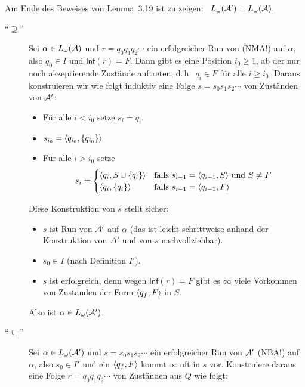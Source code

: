\documentclass[fontsize=11pt, twoside=false, numbers=autoenddot]{scrbook}
\begin{document}
Am Ende des Beweises von Lemma~3.19 ist zu zeigen:~ $L_\omega(\mathcal{A}') = L_\omega(\mathcal{A})$.
%
\begin{description}
  \item[{\boldmath"`$\supseteq$"'}]
    Sei $\alpha \in L_\omega(\mathcal{A})$ und $r = q_0q_1q_2\cdots$ ein
    erfolgreicher Run von \Amc (NMA!) auf $\alpha$, also $q_0 \in I$
    und $\textsf{Inf}(r) = F$.
    Dann gibt es eine Position $i_0 \geq 1$, ab der nur noch
    akzeptierende Zustände auftreten, d.\,h.\ $q_i \in F$ für alle $i \geq i_0$.
    Daraus konstruieren wir wie folgt induktiv eine Folge $s=s_0s_1s_2\cdots$ von Zuständen
    von $\mathcal{A}'$:
    \begin{itemize}
      \item
        Für alle $i < i_0$ setze $s_i = q_i$.
      \item
        $s_{i_0} = \langle q_{i_0},\{q_{i_0}\}\rangle$
      \item
        Für alle $i > i_0$ setze
        \[
          s_i = \begin{cases}
                  \langle q_i,S \cup \{q_i\}\rangle & \text{falls~} s_{i-1} = \langle q_{i-1},S\rangle \text{~und~} S \neq F \\
                  \langle q_i, \{q_i\}\rangle & \text{falls~} s_{i-1} = \langle q_{i-1},F\rangle 
                \end{cases}
        \]
    \end{itemize}
    Diese Konstruktion von $s$ stellt sicher:
    \begin{itemize}
      \item 
        $s$ ist Run von $\mathcal{A}'$ auf $\alpha$ (das ist leicht schrittweise anhand der Konstruktion von $\Delta'$
        und von $s$ nachvollziehbar).
      \item 
        $s_0 \in I$ (nach Definition $I'$).
      \item 
        $s$ ist erfolgreich, denn wegen $\textsf{Inf}(r) = F$
        gibt es $\infty$ viele Vorkommen von Zuständen der Form $\langle q_f,F\rangle$ in $S$.
    \end{itemize}
    Also ist $\alpha \in L_\omega(\mathcal{A}')$.
  \item[{\boldmath"`$\subseteq$"'}]
    Sei $\alpha \in L_\omega(\mathcal{A}')$ und $s = s_0s_1s_2\cdots$ ein
    erfolgreicher Run von $\mathcal{A}'$ (NBA!) auf $\alpha$, also $s_0 \in I'$
    und ein $\langle q_f,F\rangle$ kommt $\infty$ oft in $s$ vor.
    Konstruiere daraus eine Folge $r = q_0q_1q_2\cdots$ von Zuständen aus $Q$ wie folgt:
    \goodbreak
    \begin{itemize}

\end{itemize}
\end{description}
\end{document}
